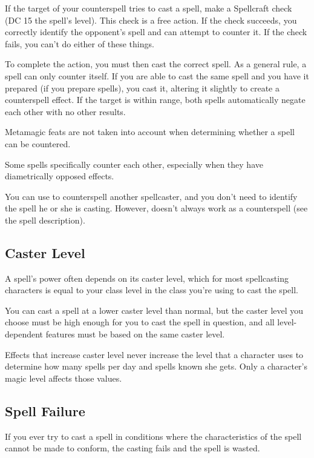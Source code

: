 If the target of your counterspell tries to cast a spell, make a Spellcraft check (DC 15 \add the spell's level). This check is a free action. If the check succeeds, you correctly identify the opponent's spell and can attempt to counter it. If the check fails, you can't do either of these things.

To complete the action, you must then cast the correct spell. As a general rule, a spell can only counter itself. If you are able to cast the same spell and you have it prepared (if you prepare spells), you cast it, altering it slightly to create a counterspell effect. If the target is within range, both spells automatically negate each other with no other results.

 Metamagic feats are not taken into account when determining whether a spell can be countered.

 Some spells specifically counter each other, especially when they have diametrically opposed effects.

 You can use  to counterspell another spellcaster, and you don't need to identify the spell he or she is casting. However,  doesn't always work as a counterspell (see the spell description).

\subsection{Caster Level}
A spell's power often depends on its caster level, which for most spellcasting characters is equal to your class level in the class you're using to cast the spell.

You can cast a spell at a lower caster level than normal, but the caster level you choose must be high enough for you to cast the spell in question, and all level-dependent features must be based on the same caster level.

Effects that increase caster level never increase the level that a character uses to determine how many spells per day and spells known she gets. Only a character's magic level affects those values.

\subsection{Spell Failure}
If you ever try to cast a spell in conditions where the characteristics of the spell cannot be made to conform, the casting fails and the spell is wasted.

